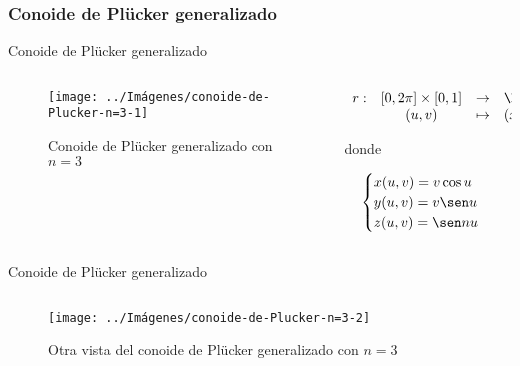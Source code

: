 \documentclass[10pt]{beamer}
\begin{document}
	\subsubsection{Conoide de Plücker generalizado}
	
	\begin{frame}{Conoide de Plücker generalizado}
		\begin{columns}[t] %
			\begin{column}{.50\textwidth}
				\begin{figure}
					\centering
					\texttt{[image: ../Imágenes/conoide-de-Plucker-n=3-1]}
					\caption{Conoide de Plücker generalizado con $n=3$}
					\label{fig:conoide-de-Plucker-generalizado-1}
				\end{figure}
			\end{column}%
			\hfill%
			\begin{column}{.50\textwidth}
				$$\begin{array}{rcll}
				r : & [0, 2\pi] \times [0,1] & \to & \R^3\\
				& (u,v) & \mapsto & (x,y,z)
				\end{array}$$
				
				donde 
				
				$$ \begin{cases}
				x(u,v) = v \cos u \\
				y(u,v) = v \sen u \\
				z(u,v) = \sen nu
				\end{cases} $$
			\end{column}%
		\end{columns}
	\end{frame}
	
	\begin{frame}{Conoide de Plücker generalizado}
		\begin{columns}[t] %
			\begin{column}{.50\textwidth}
				\begin{figure}
					\centering
					\texttt{[image: ../Imágenes/conoide-de-Plucker-n=3-2]}
					\caption{Otra vista del conoide de Plücker generalizado con $n=3$}
					\label{fig:conoide-de-Plücker-generalizado-2}
				\end{figure}
			\end{column}%
			\hfill%
			\begin{column}{.50\textwidth}
			\end{column}%
		\end{columns}
	\end{frame}
	
\end{document}
